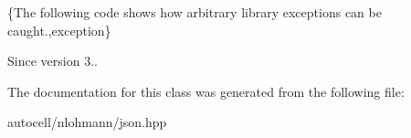 \{The following code shows how arbitrary library exceptions can be caught.,exception\}

\begin{DoxySince}{Since}
version 3.. 
\end{DoxySince}


The documentation for this class was generated from the following file\+:\begin{DoxyCompactItemize}
\item 
autocell/nlohmann/json.\+hpp\end{DoxyCompactItemize}

